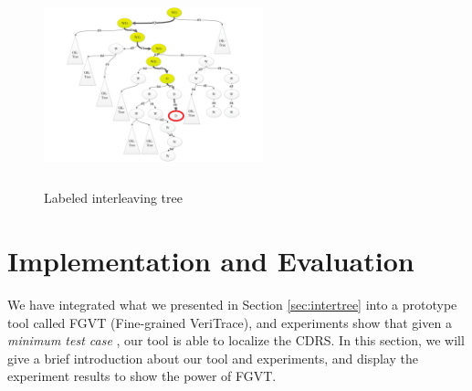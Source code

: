 \documentclass[runningheads]{llncs}
\begin{document}
\begin{figure}
\centering
\vspace{-0.7cm}
\includegraphics[height = 2.3in, width = 2.5in]{psslabeltree.pdf}
\vspace{-0.6cm}
\caption{Labeled interleaving tree}\label{fig:labeledinterleavingtreepss}
\end{figure}









\section{Implementation and Evaluation}\label{sec:implementation}
We have integrated what we presented in Section \ref{sec:intertree} into a prototype tool called FGVT (Fine-grained VeriTrace), and experiments show that given a \textit{minimum test case} \cite{DBLP:conf/seke/ZhangWZ17}, our tool is able to localize the CDRS. In this section, we will give a brief introduction about our tool and experiments, and display the experiment results to show the power of FGVT.
\end{document}
